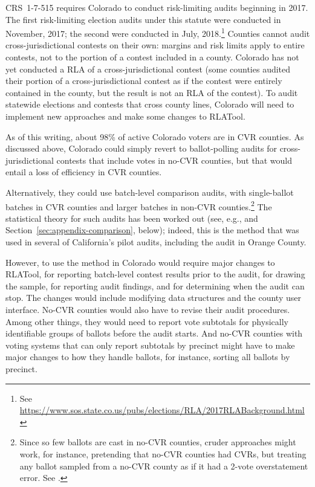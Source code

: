 \documentclass[runningheads]{llncs}
\begin{document}
CRS~1-7-515 requires Colorado to conduct risk-limiting audits beginning in 2017.
The first risk-limiting election audits under this statute were conducted in November, 2017; the second were conducted in July, 2018.\footnote{%
 See \url{https://www.sos.state.co.us/pubs/elections/RLA/2017RLABackground.html}
}
Counties cannot audit cross-jurisdictional contests on their own:
margins and risk limits apply to entire contests, not to the portion of a contest included in a county.
Colorado has not yet conducted a RLA of a cross-jurisdictional contest (some counties audited their portion of a cross-jurisdictional contest as if the contest were entirely contained in the county, but the result is not an RLA of the contest).
To audit statewide elections and contests that cross county lines, Colorado will need to implement new approaches and make some changes to RLATool.

As of this writing, about 98\% of active Colorado voters are in CVR counties.
As discussed above, Colorado could simply revert to ballot-polling audits for cross-jurisdictional contests that include votes in no-CVR counties, but that would entail a loss of efficiency in CVR counties.

Alternatively, they could use batch-level comparison audits, with single-ballot batches in CVR counties and larger batches in non-CVR counties.\footnote{%
Since so few ballots are cast in no-CVR counties, cruder approaches might work, for instance, pretending that no-CVR counties had CVRs, but treating any ballot sampled from a no-CVR county as if it had a 2-vote overstatement error. See \cite{banuelosStark12}.
}
The statistical theory for such audits has been worked out (see, e.g., \cite{stark08a,stark09c,stark09b,stark10d} and Section~\ref{sec:appendix-comparison}, below); indeed, this is the method that was used in several of California's pilot audits,
including the audit in Orange County.

However, to use the method in Colorado would require major changes to RLATool, for reporting batch-level contest results prior to the audit, for drawing the sample, for reporting audit findings, and for determining when the audit can stop. 
The changes would include modifying data structures and the county user interface.
No-CVR counties would also have to revise their audit procedures.
Among other things, they would need to report vote subtotals
for physically identifiable groups of ballots before the audit starts.
And no-CVR counties with voting systems that can only report subtotals by precinct
might have to make major changes to how they handle ballots, for instance, sorting all ballots by precinct.
\end{document}
